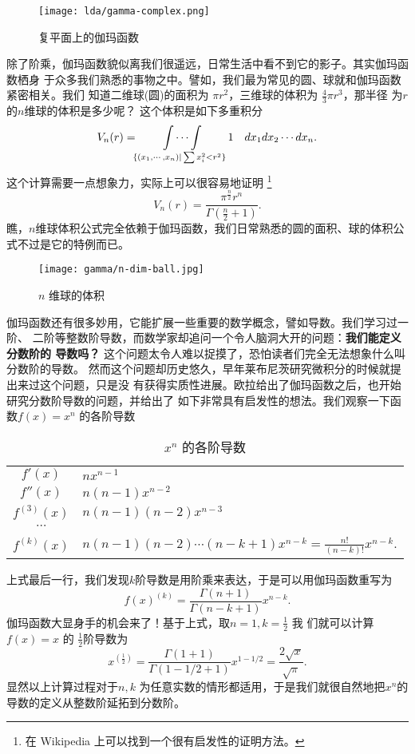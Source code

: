 {\begin{figure}[H]
\centering
\texttt{[image: lda/gamma-complex.png]}
\caption{复平面上的伽玛函数}
\end{figure}

除了阶乘，伽玛函数貌似离我们很遥远，日常生活中看不到它的影子。其实伽玛函数栖身
于众多我们熟悉的事物之中。譬如，我们最为常见的圆、球就和伽玛函数紧密相关。我们
知道二维球(圆)的面积为 $\pi r^2$，三维球的体积为 $\frac{4}{3} \pi r^3$，那半径
为$r$ 的$n$维球的体积是多少呢？ 这个体积是如下多重积分
$$ \displaystyle V_n(r) = \idotsint\limits_{ \tiny \{(x_1, \cdots, x_n) | \sum x_i^2 < r^2 \} }  1 \quad dx_1dx_2 \cdots dx_n  .$$
这个计算需要一点想象力，实际上可以很容易地证明 \footnote{在 Wikipedia 上可以找到一个很有启发性的证明方法。}
$$ V_n(r) = \frac{\pi^{\frac{n}{2}} r^n}{\Gamma(\frac{n}{2} + 1)} .$$ 
瞧，$n$维球体积公式完全依赖于伽玛函数，我们日常熟悉的圆的面积、球的体积公
式不过是它的特例而已。 

\begin{figure}[htbp]
\centering
\texttt{[image: gamma/n-dim-ball.jpg]}
\caption{$n$ 维球的体积}
\end{figure}


伽玛函数还有很多妙用，它能扩展一些重要的数学概念，譬如导数。我们学习过一阶、
二阶等整数阶导数，而数学家却追问一个令人脑洞大开的问题：{\bf 我们能定义分数阶的
导数吗？} 这个问题太令人难以捉摸了，恐怕读者们完全无法想象什么叫分数阶的导数。 
然而这个问题却历史悠久，早年莱布尼茨研究微积分的时候就提出来过这个问题，只是没
有获得实质性进展。欧拉给出了伽玛函数之后，也开始研究分数阶导数的问题，并给出了
如下非常具有启发性的想法。我们观察一下函数$f(x) = x^n$ 的各阶导数
\begin{table}[H]
\centering
\caption{$x^n$ 的各阶导数}
\begin{tabular*}{0.8\textwidth}{@{\extracolsep{\fill}}cl}
\\
$f'(x)$ & $nx^{n-1}$ \\
$f''(x)$ & $n(n-1)x^{n-2}$ \\
$f^{(3)}(x)$ & $n(n-1)(n-2)x^{n-3}$ \\
$\cdots$ &  \\
$f^{(k)}(x)$ & $n(n-1)(n-2)\cdots(n-k+1)x^{n-k} = \frac{n!}{(n-k)!} x^{n-k}$. 
\end{tabular*}
\end{table}
上式最后一行，我们发现$k$阶导数是用阶乘来表达，于是可以用伽玛函数重写为
$$ f(x)^{(k)} = \frac{\Gamma{(n+1)}}{\Gamma{(n-k+1)}} x^{n-k} .$$
伽玛函数大显身手的机会来了！基于上式，取$n=1, k=\frac{1}{2}$ 我
们就可以计算 $f(x)=x$ 的 $\frac{1}{2}$阶导数为
$$ x^{(\frac{1}{2})} = \frac{\Gamma{(1+1)}}{\Gamma{(1-1/2+1)}} x^{1-1/2} 
= \frac{2\sqrt{x}}{\sqrt{\pi}} .$$
显然以上计算过程对于$n, k$ 为任意实数的情形都适用，于是我们就很自然地把$x^n$的
导数的定义从整数阶延拓到分数阶。

}
